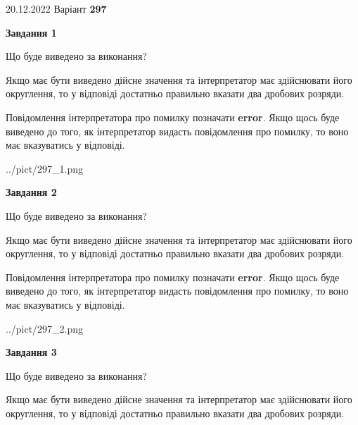 \documentclass[12pt, ukrainian]{article}
\begin{document}
{20.12.2022 Варіант \No \textbf { 297 }\par}
{
\begin {Large}

{\begin {center}\textbf{Завдання 1}\end {center}}\par
Що буде виведено за виконання? \par

Якщо має бути виведено дійсне значення та інтерпретатор має здійснювати його округлення, 
то у відповіді достатньо правильно вказати два дробових розряди.

Повідомлення інтерпретатора про помилку позначати \textbf{error}.
Якщо щось буде виведено до того, як інтерпретатор видасть повідомлення про помилку, 
то воно має вказуватись у відповіді. \par

\begin{center}
	{../pict/297_1.png}
\end{center}
\newpage

{\begin {center}\textbf{Завдання 2}\end {center}}\par
Що буде виведено за виконання? \par

Якщо має бути виведено дійсне значення та інтерпретатор має здійснювати його округлення, 
то у відповіді достатньо правильно вказати два дробових розряди.

Повідомлення інтерпретатора про помилку позначати \textbf{error}.
Якщо щось буде виведено до того, як інтерпретатор видасть повідомлення про помилку, 
то воно має вказуватись у відповіді. \par

\begin{center}
	{../pict/297_2.png}
\end{center}
\newpage

{\begin {center}\textbf{Завдання 3}\end {center}}\par
Що буде виведено за виконання? \par

Якщо має бути виведено дійсне значення та інтерпретатор має здійснювати його округлення, 
то у відповіді достатньо правильно вказати два дробових розряди.


\end{Large}}
\end{document}
